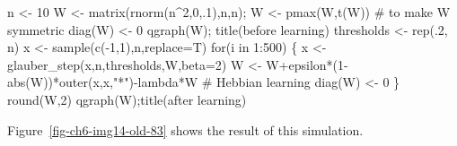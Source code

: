 \documentclass[
  a4paper,
  DIV=11,
  numbers=noendperiod,
  oneside]{scrreprt}
\newenvironment{Shaded}{}{}
\newcommand{\AttributeTok}[1]{\textcolor[rgb]{0.84,0.23,0.29}{#1}}
\newcommand{\CommentTok}[1]{\textcolor[rgb]{0.42,0.45,0.49}{#1}}
\newcommand{\ControlFlowTok}[1]{\textcolor[rgb]{0.84,0.23,0.29}{#1}}
\newcommand{\DecValTok}[1]{\textcolor[rgb]{0.00,0.36,0.77}{#1}}
\newcommand{\FunctionTok}[1]{\textcolor[rgb]{0.44,0.26,0.76}{#1}}
\newcommand{\NormalTok}[1]{\textcolor[rgb]{0.14,0.16,0.18}{#1}}
\newcommand{\OtherTok}[1]{\textcolor[rgb]{0.44,0.26,0.76}{#1}}
\newcommand{\SpecialCharTok}[1]{\textcolor[rgb]{0.00,0.36,0.77}{#1}}
\newcommand{\StringTok}[1]{\textcolor[rgb]{0.01,0.18,0.38}{#1}}
\begin{document}
\begin{Shaded}
\begin{Highlighting}[]
\NormalTok{n }\OtherTok{\textless{}{-}} \DecValTok{10}
\NormalTok{W }\OtherTok{\textless{}{-}} \FunctionTok{matrix}\NormalTok{(}\FunctionTok{rnorm}\NormalTok{(n}\SpecialCharTok{\^{}}\DecValTok{2}\NormalTok{,}\DecValTok{0}\NormalTok{,.}\DecValTok{1}\NormalTok{),n,n); W }\OtherTok{\textless{}{-}} \FunctionTok{pmax}\NormalTok{(W,}\FunctionTok{t}\NormalTok{(W)) }\CommentTok{\# to make W symmetric}
\FunctionTok{diag}\NormalTok{(W) }\OtherTok{\textless{}{-}} \DecValTok{0}
\FunctionTok{qgraph}\NormalTok{(W); }\FunctionTok{title}\NormalTok{(}\StringTok{\textquotesingle{}before learning\textquotesingle{}}\NormalTok{)}
\NormalTok{thresholds }\OtherTok{\textless{}{-}} \FunctionTok{rep}\NormalTok{(.}\DecValTok{2}\NormalTok{, n)}
\NormalTok{x }\OtherTok{\textless{}{-}} \FunctionTok{sample}\NormalTok{(}\FunctionTok{c}\NormalTok{(}\SpecialCharTok{{-}}\DecValTok{1}\NormalTok{,}\DecValTok{1}\NormalTok{),n,}\AttributeTok{replace=}\NormalTok{T)}
\ControlFlowTok{for}\NormalTok{(i }\ControlFlowTok{in} \DecValTok{1}\SpecialCharTok{:}\DecValTok{500}\NormalTok{)}
\NormalTok{\{}
\NormalTok{x }\OtherTok{\textless{}{-}} \FunctionTok{glauber\_step}\NormalTok{(x,n,thresholds,W,}\AttributeTok{beta=}\DecValTok{2}\NormalTok{)}
\NormalTok{W }\OtherTok{\textless{}{-}}\NormalTok{ W}\SpecialCharTok{+}\NormalTok{epsilon}\SpecialCharTok{*}\NormalTok{(}\DecValTok{1}\SpecialCharTok{{-}}\FunctionTok{abs}\NormalTok{(W))}\SpecialCharTok{*}\FunctionTok{outer}\NormalTok{(x,x,}\StringTok{"*"}\NormalTok{)}\SpecialCharTok{{-}}\NormalTok{lambda}\SpecialCharTok{*}\NormalTok{W }\CommentTok{\# Hebbian learning}
\FunctionTok{diag}\NormalTok{(W) }\OtherTok{\textless{}{-}} \DecValTok{0}
\NormalTok{\}}
\FunctionTok{round}\NormalTok{(W,}\DecValTok{2}\NormalTok{)}
\FunctionTok{qgraph}\NormalTok{(W);}\FunctionTok{title}\NormalTok{(}\StringTok{\textquotesingle{}after learning\textquotesingle{}}\NormalTok{)}
\end{Highlighting}
\end{Shaded}

Figure~\ref{fig-ch6-img14-old-83} shows the result of this simulation.
\end{document}
